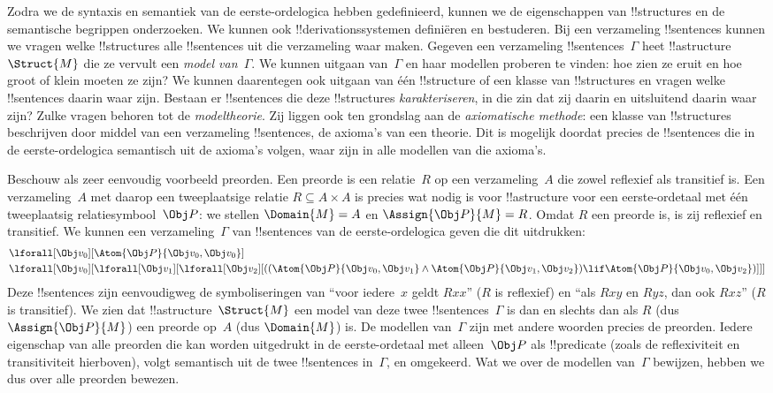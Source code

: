 \documentclass[../../../include/open-logic-section]{subfiles}
\begin{document}


Zodra we de syntaxis en semantiek van de eerste-ordelogica hebben
gedefinieerd, kunnen we de eigenschappen van !!{structure}s en de
semantische begrippen onderzoeken. We kunnen ook
!!{derivation}ssystemen definiëren en bestuderen. Bij een verzameling
!!{sentence}s kunnen we vragen welke !!{structure}s alle !!{sentence}s
uit die verzameling waar maken. Gegeven een verzameling
!!{sentence}s~$\Gamma$ heet !!a{structure}~$\Struct{M}$ die ze vervult
een \emph{model van~$\Gamma$}. We kunnen uitgaan van~$\Gamma$ en haar
modellen proberen te vinden: hoe zien ze eruit en hoe groot of klein
moeten ze zijn? We kunnen daarentegen ook uitgaan van één !!{structure}
of een klasse van !!{structure}s en vragen welke !!{sentence}s daarin
waar zijn. Bestaan er !!{sentence}s die deze !!{structure}s
\emph{karakteriseren}, in die zin dat zij daarin en uitsluitend daarin
waar zijn? Zulke vragen behoren tot de \emph{modeltheorie}. Zij liggen
ook ten grondslag aan de \emph{axiomatische methode}: een klasse van
!!{structure}s beschrijven door middel van een verzameling
!!{sentence}s, de axioma's van een theorie. Dit is mogelijk doordat
precies de !!{sentence}s die in de eerste-ordelogica semantisch uit de
axioma's volgen, waar zijn in alle modellen van die axioma's.

Beschouw als zeer eenvoudig voorbeeld preorden. Een preorde is een
relatie~$R$ op een verzameling~$A$ die zowel reflexief als transitief
is. Een verzameling~$A$ met daarop een tweeplaatsige relatie
$R \subseteq A \times A$ is precies wat nodig is voor !!a{structure}
voor een eerste-ordetaal met één tweeplaatsig relatiesymbool~$\Obj P$:
we stellen $\Domain{M} = A$ en $\Assign{\Obj P}{M} = R$. Omdat $R$ een
preorde is, is zij reflexief en transitief. We kunnen een
verzameling~$\Gamma$ van !!{sentence}s van de eerste-ordelogica geven
die dit uitdrukken:
\begin{align*}
  & \lforall[\Obj v_0][\Atom{\Obj P}{\Obj v_0,\Obj v_0}]\\
  & \lforall[\Obj v_0][\lforall[\Obj v_1][\lforall[\Obj v_2][((\Atom{\Obj P}{\Obj v_0,\Obj v_1} \land \Atom{\Obj P}{\Obj v_1,\Obj v_2}) \lif \Atom{\Obj P}{\Obj v_0,\Obj v_2})]]]
\end{align*}
Deze !!{sentence}s zijn eenvoudigweg de symboliseringen van ``voor
iedere~$x$ geldt $Rxx$'' ($R$ is reflexief) en ``als $Rxy$ en $Ryz$,
dan ook $Rxz$'' ($R$ is transitief). We zien dat
!!a{structure}~$\Struct{M}$ een model van deze twee
!!{sentence}s~$\Gamma$ is dan en slechts dan als $R$ (dus
$\Assign{\Obj P}{M}$) een preorde op~$A$ (dus $\Domain{M}$) is. De
modellen van~$\Gamma$ zijn met andere woorden precies de preorden.
Iedere eigenschap van alle preorden die kan worden uitgedrukt in de
eerste-ordetaal met alleen~$\Obj P$ als !!{predicate} (zoals de
reflexiviteit en transitiviteit hierboven), volgt semantisch uit de
twee !!{sentence}s in~$\Gamma$, en omgekeerd. Wat we over de modellen
van~$\Gamma$ bewijzen, hebben we dus over alle preorden bewezen.
\end{document}
